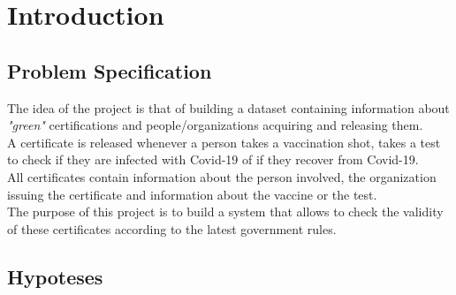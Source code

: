 \documentclass[12pt, a4paper]{article}
\begin{document}
\clearpage

{
    \hypersetup{hidelinks}
    \tableofcontents
}

\clearpage

\section{Introduction}

\subsection{Problem Specification}

The idea of the project is that of building a dataset containing information about 
\emph{"green"} certifications and people/organizations acquiring and releasing them. \\ 
A certificate is released whenever a person takes a vaccination shot, takes a test to 
check if they are infected with Covid-19 of if they recover from Covid-19. \\
All certificates contain information about the person 
involved, the organization issuing the certificate and information about the vaccine or 
the test. \\
The purpose of this project is to build a system that allows to check the validity of 
these certificates according to the latest government rules.

\subsection{Hypoteses}
\end{document}
